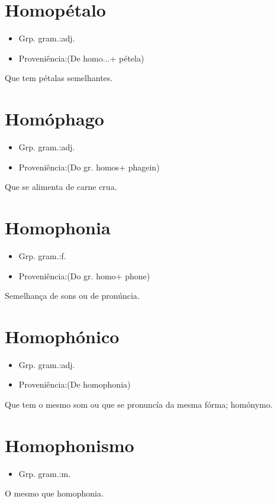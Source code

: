 \documentclass{article}
\begin{document}
\section{Homopétalo}
\begin{itemize}
\item {Grp. gram.:adj.}
\end{itemize}
\begin{itemize}
\item {Proveniência:(De \textunderscore homo...\textunderscore  + \textunderscore pétela\textunderscore )}
\end{itemize}
Que tem pétalas semelhantes.
\section{Homóphago}
\begin{itemize}
\item {Grp. gram.:adj.}
\end{itemize}
\begin{itemize}
\item {Proveniência:(Do gr. \textunderscore homos\textunderscore  + \textunderscore phagein\textunderscore )}
\end{itemize}
Que se alimenta de carne crua.
\section{Homophonia}
\begin{itemize}
\item {Grp. gram.:f.}
\end{itemize}
\begin{itemize}
\item {Proveniência:(Do gr. \textunderscore homo\textunderscore  + \textunderscore phone\textunderscore )}
\end{itemize}
Semelhança de sons ou de pronúncia.
\section{Homophónico}
\begin{itemize}
\item {Grp. gram.:adj.}
\end{itemize}
\begin{itemize}
\item {Proveniência:(De \textunderscore homophonia\textunderscore )}
\end{itemize}
Que tem o mesmo som ou que se pronuncía da mesma fórma; homónymo.
\section{Homophonismo}
\begin{itemize}
\item {Grp. gram.:m.}
\end{itemize}
O mesmo que \textunderscore homophonia\textunderscore .
\end{document}
